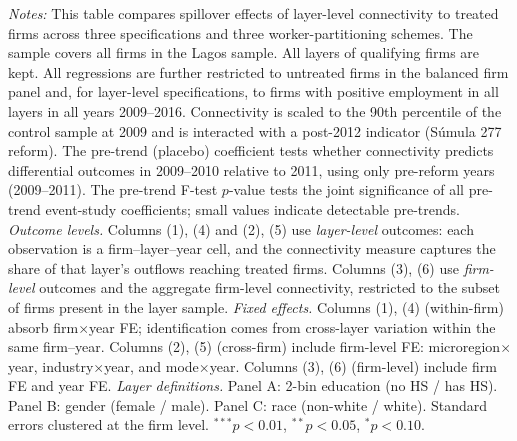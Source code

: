 \begin{table}[H]
\begin{threeparttable}
\begin{tablenotes}[flushleft]
\item \textit{Notes:} This table compares spillover effects of layer-level connectivity to treated firms across three specifications and three worker-partitioning schemes. The sample covers all firms in the Lagos sample. All layers of qualifying firms are kept. All regressions are further restricted to untreated firms in the balanced firm panel and, for layer-level specifications, to firms with positive employment in all layers in all years 2009--2016. Connectivity is scaled to the 90th percentile of the control sample at 2009 and is interacted with a post-2012 indicator (S\'{u}mula 277 reform). The pre-trend (placebo) coefficient tests whether connectivity predicts differential outcomes in 2009--2010 relative to 2011, using only pre-reform years (2009--2011). The pre-trend F-test $p$-value tests the joint significance of all pre-trend event-study coefficients; small values indicate detectable pre-trends. \textit{Outcome levels.} Columns (1), (4) and (2), (5) use \textit{layer-level} outcomes: each observation is a firm--layer--year cell, and the connectivity measure captures the share of that layer's outflows reaching treated firms. Columns (3), (6) use \textit{firm-level} outcomes and the aggregate firm-level connectivity, restricted to the subset of firms present in the layer sample. \textit{Fixed effects.} Columns (1), (4) (within-firm) absorb firm$\times$year FE; identification comes from cross-layer variation within the same firm--year. Columns (2), (5) (cross-firm) include firm-level FE: microregion$\times$year, industry$\times$year, and mode$\times$year. Columns (3), (6) (firm-level) include firm FE and year FE. \textit{Layer definitions.} Panel A: 2-bin education (no HS / has HS). Panel B: gender (female / male). Panel C: race (non-white / white). Standard errors clustered at the firm level. $^{***}p<0.01$, $^{**}p<0.05$, $^{*}p<0.10$.
\end{tablenotes}
\end{threeparttable}
\end{table}